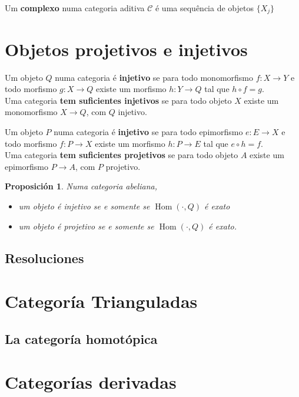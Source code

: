 \documentclass[12pt]{book}
\newtheorem{pro}{Proposición}
\begin{document}
Um \textbf{complexo} numa categoria aditiva $\mathcal{C}$ é uma sequência de objetos $\{X_j\}$

\section{Objetos projetivos e injetivos}

Um objeto $Q$ numa categoria é \textbf{injetivo} se para todo monomorfismo $f:X\rightarrow Y$ e todo morfismo $g:X \rightarrow Q$ existe um morfismo $h: Y\rightarrow Q$ tal que $h\circ f =g$.\\
Uma categoria \textbf{tem suficientes injetivos} se para todo objeto $X$ existe um monomorfismo $X\rightarrow Q$, com $Q$ injetivo.


Um objeto $P$ numa categoria é \textbf{injetivo} se para todo epimorfismo $e:E\rightarrow X$ e todo morfismo $f:P \rightarrow X$ existe um morfismo $h: P\rightarrow E$ tal que $e\circ h =f$.\\
Uma categoria \textbf{tem suficientes projetivos} se para todo objeto $A$ existe um epimorfismo $P\rightarrow A$, com $P$ projetivo.

\begin{pro}
	Numa categoria abeliana, 
	\begin{itemize}
		\item um objeto é injetivo se e somente se $\operatorname{Hom}(\cdot , Q)$ é exato
		\item um objeto é projetivo se e somente se $\operatorname{Hom}(\cdot , Q)$ é exato.
	\end{itemize}
\end{pro}



\subsection{Resoluciones}


\section{Categoría Trianguladas}



\subsection{La categoría homotópica}





\section{Categorías derivadas}
\end{document}
